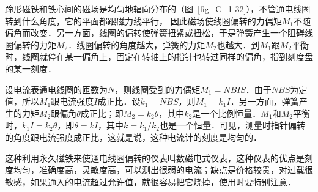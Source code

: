 蹄形磁铁和铁心间的磁场是均匀地辐向分布的（图~\ref{fig_C_1-32}），不管通电线圈转到什么角度，它的平面都跟磁力线平行，
因此磁场使线圈偏转的力偶矩$M_1$不随偏角而改变．另一方面，线圈的偏转使弹簧扭紧或扭松，于是弹簧产生一个阻碍线圈偏转的力矩$M_2$．线圈偏转的角度越大，弹簧的力矩$M_2$也越大．到$M_1$跟$M_2$平衡时，线圈就停在某一偏角上，固定在转轴上的指针也转过同样的偏角，指到刻度盘的某一刻度．

设电流表通电线圈的匝数为$N$，则线圈受到的力偶矩$M_1=NBIS$．由于$NBS$为定值，所以$M_1$跟电流强度$I$成正比．设$k_1=NBS$，则$M_1=k_1I$．另一方面，弹簧产生的力矩$M_2$跟偏角$\theta$成正比；即$M_2=k_2\theta$，其中$k_2$是一个比例恒量．$M_1$和$M_2$平衡时，$k_1I=k_2\theta$，即$\theta =kI$，其中$k=k_1/k_2$也是一个恒量．可见，测量时指针偏转的角度跟电流强度成正比，这就是说，这种电流计的刻度是均匀的．

这种利用永久磁铁来使通电线圈偏转的仪表叫数磁电式仪表，这种仪表的优点是刻度均匀，准确度高，灵敏度高，可以测出很弱的电流；缺点是价格较贵，对过载很敏感，如果通入的电流超过允许值，就很容易把它烧掉，使用时要特别注意．

